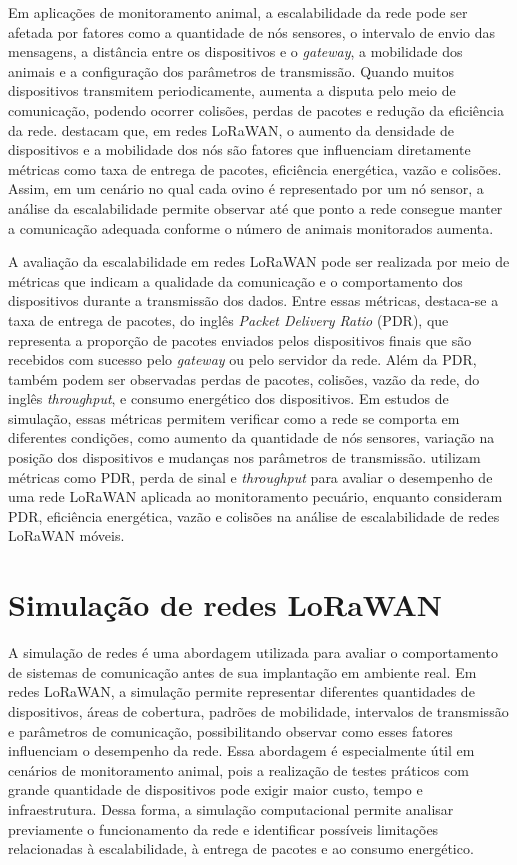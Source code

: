 Em aplicações de monitoramento animal, a escalabilidade da rede pode ser afetada por fatores como a quantidade de nós sensores, o intervalo de envio das mensagens, a distância entre os dispositivos e o \textit{gateway}, a mobilidade dos animais e a configuração dos parâmetros de transmissão. Quando muitos dispositivos transmitem periodicamente, aumenta a disputa pelo meio de comunicação, podendo ocorrer colisões, perdas de pacotes e redução da eficiência da rede.  destacam que, em redes LoRaWAN, o aumento da densidade de dispositivos e a mobilidade dos nós são fatores que influenciam diretamente métricas como taxa de entrega de pacotes, eficiência energética, vazão e colisões. Assim, em um cenário no qual cada ovino é representado por um nó sensor, a análise da escalabilidade permite observar até que ponto a rede consegue manter a comunicação adequada conforme o número de animais monitorados aumenta.

A avaliação da escalabilidade em redes LoRaWAN pode ser realizada por meio de métricas que indicam a qualidade da comunicação e o comportamento dos dispositivos durante a transmissão dos dados. Entre essas métricas, destaca-se a taxa de entrega de pacotes, do inglês \textit{Packet Delivery Ratio} (PDR), que representa a proporção de pacotes enviados pelos dispositivos finais que são recebidos com sucesso pelo \textit{gateway} ou pelo servidor da rede. Além da PDR, também podem ser observadas perdas de pacotes, colisões, vazão da rede, do inglês \textit{throughput}, e consumo energético dos dispositivos. Em estudos de simulação, essas métricas permitem verificar como a rede se comporta em diferentes condições, como aumento da quantidade de nós sensores, variação na posição dos dispositivos e mudanças nos parâmetros de transmissão.  utilizam métricas como PDR, perda de sinal e \textit{throughput} para avaliar o desempenho de uma rede LoRaWAN aplicada ao monitoramento pecuário, enquanto  consideram PDR, eficiência energética, vazão e colisões na análise de escalabilidade de redes LoRaWAN móveis.

\section{Simulação de redes LoRaWAN}
\label{sec:simulacao-lorawan}

A simulação de redes é uma abordagem utilizada para avaliar o comportamento de sistemas de comunicação antes de sua implantação em ambiente real. Em redes LoRaWAN, a simulação permite representar diferentes quantidades de dispositivos, áreas de cobertura, padrões de mobilidade, intervalos de transmissão e parâmetros de comunicação, possibilitando observar como esses fatores influenciam o desempenho da rede. Essa abordagem é especialmente útil em cenários de monitoramento animal, pois a realização de testes práticos com grande quantidade de dispositivos pode exigir maior custo, tempo e infraestrutura. Dessa forma, a simulação computacional permite analisar previamente o funcionamento da rede e identificar possíveis limitações relacionadas à escalabilidade, à entrega de pacotes e ao consumo energético.


